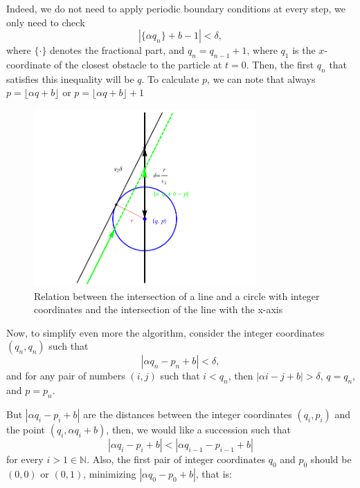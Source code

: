 \documentclass[prl,amsmath,amssymb, twocolumn, showpacs]{revtex4-1}
\begin{document}
Indeed, we do not need to apply periodic boundary conditions at every step, we only need to check 
\begin{equation}
|\{ \alpha  q_n \}+b -1|< \delta, 
\label{eq:master}
\end{equation}
where $\{ \cdot \}$ denotes the fractional part, and $q_n=q_{n-1}+1$, where $q_1$ is the $x$-coordinate of the closest obstacle to the particle at $t=0$. Then, the first $q_n$ that satisfies this inequality will be $q$. To calculate $p$, we can note that always $p=\lfloor \alpha q +b\rfloor$ or $p=\lfloor \alpha q +b\rfloor+1$

\begin{figure}
\centering
\includegraphics [width=240pt]{fig01.pdf}
\caption{Relation between the intersection of a line and a circle with integer coordinates and the intersection of the line with the x-axis}
\label{fig:circle}
\end{figure}


Now, to simplify even more the algorithm, consider the integer coordinates $(q_n, q_n)$ such that
\begin{equation}
|\alpha q_n -p_n + b|< \delta,
\label{eq:1}
\end{equation}
and for any pair of numbers $(i,j)$ such that $i<q_n$, then $|\alpha i -j+ b|> \delta$,  $q=q_n$, and $p=p_n$. 
 
But $|\alpha q_i - p_i + b|$ are the distances between the integer coordinates $(q_i, p_i)$ and the point $( q_i ,\alpha q_i + b)$, then, we would like a succession such that  
\begin{equation}
|\alpha q_i - p_i + b|<|\alpha q_{i-1} - p_{i-1} + b|
\label{eq:iteration}
\end{equation}
for every $i>1 \in   \mathbb{N}$. Also, the first pair of integer coordinates $q_0$ and $p_0$ should be $(0, 0)$ or $(0, 1)$, minimizing $|\alpha q_0 - p_0 + b|$, that is:
\end{document}
